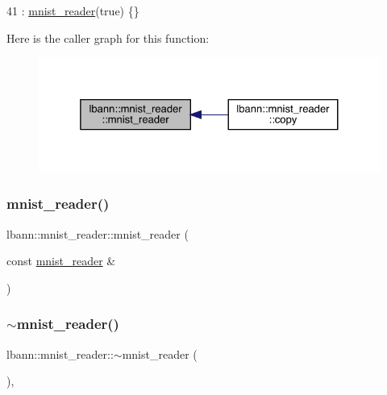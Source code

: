 \begin{DoxyCode}
41   : \hyperlink{classlbann_1_1mnist__reader_a7634b11fdfc3501bd75d60c567158cbf}{mnist\_reader}(\textcolor{keyword}{true}) \{\}
\end{DoxyCode}
Here is the caller graph for this function\+:\nopagebreak
\begin{figure}[H]
\begin{center}
\leavevmode
\includegraphics[width=325pt]{classlbann_1_1mnist__reader_a7634b11fdfc3501bd75d60c567158cbf_icgraph}
\end{center}
\end{figure}
\mbox{\label{classlbann_1_1mnist__reader_a0a7d55ae11467bd779695014817a30ec}} 
\subsubsection{\texorpdfstring{mnist\+\_\+reader()}{mnist\_reader()}\hspace{0.1cm}{\footnotesize\ttfamily [3/3]}}
{\footnotesize\ttfamily lbann\+::mnist\+\_\+reader\+::mnist\+\_\+reader (\begin{DoxyParamCaption}\item[{const \hyperlink{classlbann_1_1mnist__reader}{mnist\+\_\+reader} \&}]{ }\end{DoxyParamCaption})\hspace{0.3cm}{\ttfamily [default]}}

\mbox{\label{classlbann_1_1mnist__reader_a8369d1f8aff2c8a7d8b64e387f56981c}} 
\subsubsection{\texorpdfstring{$\sim$mnist\+\_\+reader()}{~mnist\_reader()}}
{\footnotesize\ttfamily lbann\+::mnist\+\_\+reader\+::$\sim$mnist\+\_\+reader (\begin{DoxyParamCaption}{ }\end{DoxyParamCaption})\hspace{0.3cm}{\ttfamily [inline]}, {\ttfamily [override]}}



